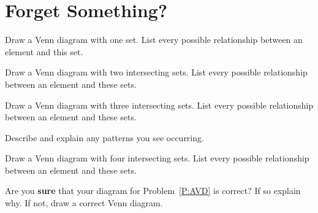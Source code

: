 \newpage
\section{Forget Something?} 


\begin{prob} 
Draw a Venn diagram with one set. List every possible relationship
between an element and this set. 
\end{prob}

\begin{prob} 
Draw a Venn diagram with two intersecting sets. List every possible
relationship between an element and these sets.
\end{prob}


\begin{prob} 
Draw a Venn diagram with three intersecting sets. List every possible
relationship between an element and these sets.
\end{prob}

\begin{prob}
Describe and explain any patterns you see occurring.
\end{prob}

\begin{prob}\label{P:AVD}
Draw a Venn diagram with four intersecting sets. List every possible
relationship between an element and these sets.
\end{prob}

\begin{prob}
Are you \textbf{sure} that your diagram for Problem~\ref{P:AVD} is
correct? If so explain why. If not, draw a correct Venn diagram.
\end{prob}
